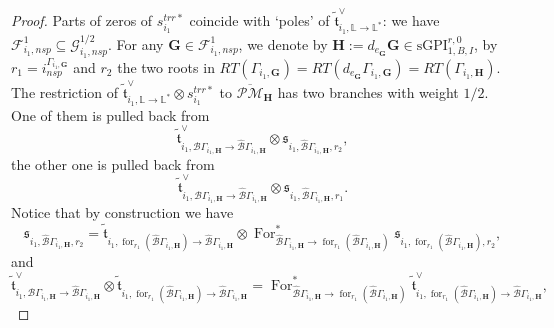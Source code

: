 \documentclass[11pt]{amsart}
\theoremstyle{definition}
\theoremstyle{remark}
\newcommand{\oPMb}{{\overline{\mathcal{PM}}}}
\newcommand{\nontilde}{}
\newcommand{\<}{\left<}
\renewcommand{\>}{\right>}
\numberwithin{equation}{section}
\def\sGPI{\text{sGPI}}
\begin{document}
\begin{proof}
        Parts of zeros of $\nontilde{s}^{trr*}_{i_1}$ coincide with `poles' of $\tilde{\mathfrak{t}}^{\vee}_{i_1,\mathbb L \to \mathbb L^*}$: we have $ \bm{\mathcal F}^1_{i_1,nsp}\subseteq \bm{\mathcal G}^{1/2}_{i_1,nsp}$. For any $\bm{G}\in \bm{\mathcal F}^1_{i_1,nsp}$, we denote by $\bm{H}:=d_{e_{\bm{G}}}\bm{G}\in \sGPI^{r,0}_{1,B,I}$, by $r_1=i^{\Gamma_{i_1,\bm{G}}}_{nsp}$ and $r_2$ the two roots in $RT(\Gamma_{i_1,\bm{G}})=RT(d_{e_{\bm{G}}}\Gamma_{i_1,\bm{G}})=RT(\Gamma_{i_1,\bm{H}})$. The restriction of $\tilde{\mathfrak{t}}^{\vee}_{i_1,\mathbb L \to \mathbb L^*}\otimes
        \nontilde{s}^{trr*}_{i_1}$ to $\oPMb_{\bm{H}}$ has two branches with weight $1/2$. One of them is pulled back from 
        \begin{equation}\label{eq one branch that zero and pole will cancel in proof}
        \tilde{\mathfrak t}^\vee_{i_1,{\mathcal B}\Gamma_{i_1,\bm{H}}\to\hat{\mathcal B}\Gamma_{i_1,\bm{H}}}\otimes \mathfrak s_{i_1,\hat{\mathcal B}\Gamma_{i_1,\bm{H}},r_2},
        \end{equation}
         the other one is pulled back from \begin{equation}\label{eq one branch that zero and pole will not cancel in the chosen strata}
        \tilde{\mathfrak t}^\vee_{i_1,{\mathcal B}\Gamma_{i_1,\bm{H}}\to\hat{\mathcal B}\Gamma_{i_1,\bm{H}}}\otimes \mathfrak s_{i_1,\hat{\mathcal B}\Gamma_{i_1,\bm{H}},r_1}.
        \end{equation}
        Notice that by construction we have 
        $$
        \mathfrak s_{i_1,\hat{\mathcal B}\Gamma_{i_1,\bm{H}},r_2}= \tilde{\mathfrak t}_{i_1,\operatorname{for}_{r_1}(\hat{\mathcal B}\Gamma_{i_1,\bm{H}}) \to \hat{\mathcal B}\Gamma_{i_1,\bm{H}}}\otimes \operatorname{For}^*_{\hat{\mathcal B}\Gamma_{i_1,\bm{H}} \to \operatorname{for}_{r_1}(\hat{\mathcal B}\Gamma_{i_1,\bm{H}})}\mathfrak s_{i_1,\operatorname{for}_{r_1}(\hat{\mathcal B}\Gamma_{i_1,\bm{H}}),r_2},
        $$
and 
        \begin{equation*}
        \tilde{\mathfrak t}^\vee_{i_1,{\mathcal B}\Gamma_{i_1,\bm{H}}\to\hat{\mathcal B}\Gamma_{i_1,\bm{H}}} \otimes \tilde{\mathfrak t}_{i_1, \operatorname{for}_{r_1}(\hat{\mathcal B}\Gamma_{i_1,\bm{H}})\to \hat{\mathcal B}\Gamma_{i_1,\bm{H}}}
        = 
        \operatorname{For}^*_{\hat{\mathcal B}\Gamma_{i_1,\bm{H}} \to \operatorname{for}_{r_1}(\hat{\mathcal B}\Gamma_{i_1,\bm{H}})}
        \tilde{\mathfrak t}^\vee_{i_1,\operatorname{for}_{r_1}(\hat{\mathcal B}\Gamma_{i_1,\bm{H}})\to\hat{\mathcal B}\Gamma_{i_1,\bm{H}}},

\end{equation*}
\end{proof}
\end{document}
